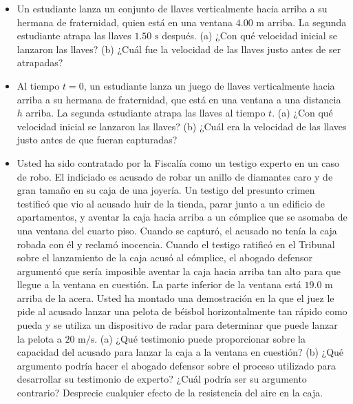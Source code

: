 \documentclass[11pt,a4paper]{article}
\begin{document}
\newpage

\begin{itemize}
    \item[\textbf{29.}] Un estudiante lanza un conjunto de llaves verticalmente hacia arriba a su hermana de fraternidad, quien está en una ventana $4.00 \text{ m}$ arriba. La segunda estudiante atrapa las llaves $1.50 \text{ s}$ después. (a) ¿Con qué velocidad inicial se lanzaron las llaves? (b) ¿Cuál fue la velocidad de las llaves justo antes de ser atrapadas?
    \vspace*{6cm}

    \item[\textbf{30.}] Al tiempo $t = 0$, un estudiante lanza un juego de llaves verticalmente hacia arriba a su hermana de fraternidad, que está en una ventana a una distancia $h$ arriba. La segunda estudiante atrapa las llaves al tiempo $t$. (a) ¿Con qué velocidad inicial se lanzaron las llaves? (b) ¿Cuál era la velocidad de las llaves justo antes de que fueran capturadas?
    \vspace*{6cm}

    \item[\textbf{31.}] Usted ha sido contratado por la Fiscalía como un testigo experto en un caso de robo. El indiciado es acusado de robar un anillo de diamantes caro y de gran tamaño en su caja de una joyería. Un testigo del presunto crimen testificó que vio al acusado huir de la tienda, parar junto a un edificio de apartamentos, y aventar la caja hacia arriba a un cómplice que se asomaba de una ventana del cuarto piso. Cuando se capturó, el acusado no tenía la caja robada con él y reclamó inocencia. Cuando el testigo ratificó en el Tribunal sobre el lanzamiento de la caja acusó al cómplice, el abogado defensor argumentó que sería imposible aventar la caja hacia arriba tan alto para que llegue a la ventana en cuestión. La parte inferior de la ventana está $19.0 \text{ m}$ arriba de la acera. Usted ha montado una demostración en la que el juez le pide al acusado lanzar una pelota de béisbol horizontalmente tan rápido como pueda y se utiliza un dispositivo de radar para determinar que puede lanzar la pelota a $20 \text{ m/s}$. (a) ¿Qué testimonio puede proporcionar sobre la capacidad del acusado para lanzar la caja a la ventana en cuestión? (b) ¿Qué argumento podría hacer el abogado defensor sobre el proceso utilizado para desarrollar su testimonio de experto? ¿Cuál podría ser su argumento contrario? Desprecie cualquier efecto de la resistencia del aire en la caja.
    \vspace*{8cm}
\end{itemize}
\end{document}
